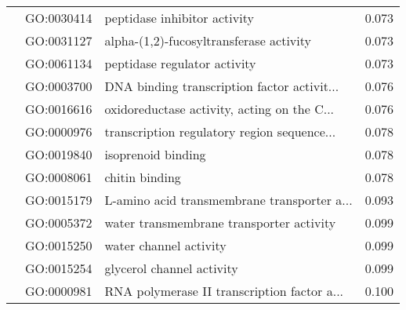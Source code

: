 \begin{longtable}{lllr}
   & GO:0030414 &                 peptidase inhibitor activity &         0.073 \\
   & GO:0031127 &      alpha-(1,2)-fucosyltransferase activity &         0.073 \\
   & GO:0061134 &                 peptidase regulator activity &         0.073 \\
   & GO:0003700 &  DNA binding transcription factor activit... &         0.076 \\
   & GO:0016616 &  oxidoreductase activity, acting on the C... &         0.076 \\
   & GO:0000976 &  transcription regulatory region sequence... &         0.078 \\
   & GO:0019840 &                           isoprenoid binding &         0.078 \\
   & GO:0008061 &                               chitin binding &         0.078 \\
   & GO:0015179 &  L-amino acid transmembrane transporter a... &         0.093 \\
   & GO:0005372 &     water transmembrane transporter activity &         0.099 \\
   & GO:0015250 &                       water channel activity &         0.099 \\
   & GO:0015254 &                    glycerol channel activity &         0.099 \\
   & GO:0000981 &  RNA polymerase II transcription factor a... &         0.100 \\
\end{longtable}
